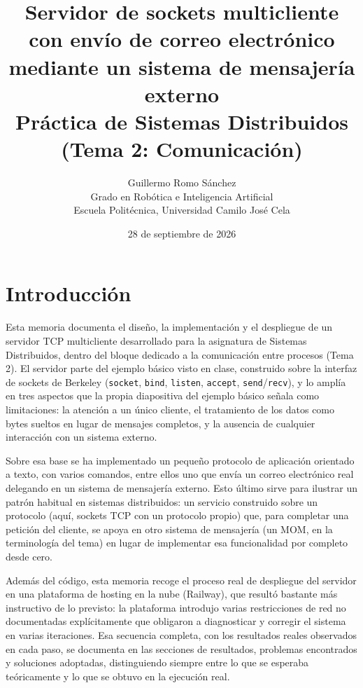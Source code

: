 \documentclass[12pt,a4paper]{article}
\title{
    \Large\textbf{Servidor de sockets multicliente con envío de correo electrónico mediante un sistema de mensajería externo}\\[0.3cm]
    \large Práctica de Sistemas Distribuidos (Tema 2: Comunicación)
}
\author{Guillermo Romo Sánchez \\ Grado en Robótica e Inteligencia Artificial \\ Escuela Politécnica, Universidad Camilo José Cela}
\date{28 de septiembre de 2026}
\begin{document}
\maketitle
\tableofcontents
\newpage

\section{Introducción}

Esta memoria documenta el diseño, la implementación y el despliegue de un servidor TCP multicliente desarrollado para la asignatura de Sistemas Distribuidos, dentro del bloque dedicado a la comunicación entre procesos (Tema 2). El servidor parte del ejemplo básico visto en clase, construido sobre la interfaz de sockets de Berkeley (\texttt{socket}, \texttt{bind}, \texttt{listen}, \texttt{accept}, \texttt{send}/\texttt{recv}), y lo amplía en tres aspectos que la propia diapositiva del ejemplo básico señala como limitaciones: la atención a un único cliente, el tratamiento de los datos como bytes sueltos en lugar de mensajes completos, y la ausencia de cualquier interacción con un sistema externo.

Sobre esa base se ha implementado un pequeño protocolo de aplicación orientado a texto, con varios comandos, entre ellos uno que envía un correo electrónico real delegando en un sistema de mensajería externo. Esto último sirve para ilustrar un patrón habitual en sistemas distribuidos: un servicio construido sobre un protocolo (aquí, sockets TCP con un protocolo propio) que, para completar una petición del cliente, se apoya en otro sistema de mensajería (un MOM, en la terminología del tema) en lugar de implementar esa funcionalidad por completo desde cero.

Además del código, esta memoria recoge el proceso real de despliegue del servidor en una plataforma de hosting en la nube (Railway), que resultó bastante más instructivo de lo previsto: la plataforma introdujo varias restricciones de red no documentadas explícitamente que obligaron a diagnosticar y corregir el sistema en varias iteraciones. Esa secuencia completa, con los resultados reales observados en cada paso, se documenta en las secciones de resultados, problemas encontrados y soluciones adoptadas, distinguiendo siempre entre lo que se esperaba teóricamente y lo que se obtuvo en la ejecución real.


\end{document}

